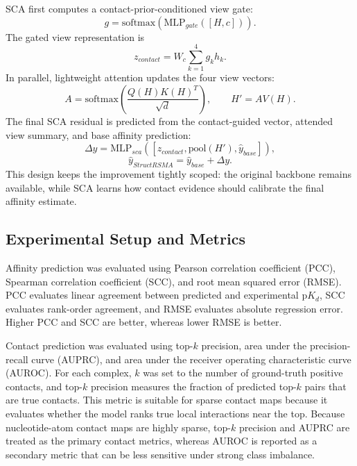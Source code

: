 ﻿\documentclass[journal=jcisd8,manuscript=article]{achemso}
\begin{document}
SCA first computes a contact-prior-conditioned view gate:
\begin{equation}
g=\mathrm{softmax}(\mathrm{MLP}_{gate}([H,c])).
\end{equation}
The gated view representation is
\begin{equation}
z_{contact}=W_c\sum_{k=1}^{4} g_k h_k.
\end{equation}
In parallel, lightweight attention updates the four view vectors:
\begin{equation}
A=\mathrm{softmax}\left(\frac{Q(H)K(H)^T}{\sqrt{d}}\right), \qquad
H' = A V(H).
\end{equation}
The final SCA residual is predicted from the contact-guided vector, attended view summary, and base affinity prediction:
\begin{equation}
\Delta y = \mathrm{MLP}_{sca}([z_{contact},\mathrm{pool}(H'),\hat{y}_{base}]),
\end{equation}
\begin{equation}
\hat{y}_{StructRSMA} = \hat{y}_{base} + \Delta y.
\end{equation}
This design keeps the improvement tightly scoped: the original backbone remains available, while SCA learns how contact evidence should calibrate the final affinity estimate.

\subsection{Experimental Setup and Metrics}

Affinity prediction was evaluated using Pearson correlation coefficient (PCC), Spearman correlation coefficient (SCC), and root mean squared error (RMSE). PCC evaluates linear agreement between predicted and experimental p$K_d$, SCC evaluates rank-order agreement, and RMSE evaluates absolute regression error. Higher PCC and SCC are better, whereas lower RMSE is better.

Contact prediction was evaluated using top-$k$ precision, area under the precision-recall curve (AUPRC), and area under the receiver operating characteristic curve (AUROC). For each complex, $k$ was set to the number of ground-truth positive contacts, and top-$k$ precision measures the fraction of predicted top-$k$ pairs that are true contacts. This metric is suitable for sparse contact maps because it evaluates whether the model ranks true local interactions near the top. Because nucleotide-atom contact maps are highly sparse, top-$k$ precision and AUPRC are treated as the primary contact metrics, whereas AUROC is reported as a secondary metric that can be less sensitive under strong class imbalance.
\end{document}

